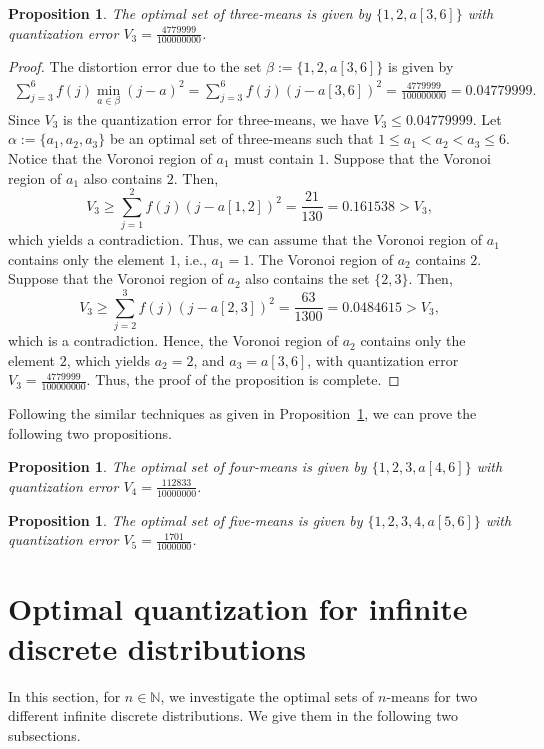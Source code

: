 \documentclass[12pt, reqno]{amsart}
\theoremstyle{plain}
\newtheorem{prop}[subsection]{Proposition}
\theoremstyle{definition}
\newcommand{\set}[1]{\{#1\}}%
\newcommand{\ga}{\alpha}
\newcommand{\gb}{\beta}
\newcommand{\D}[1]{\mathbb{#1}}%
\begin{document}
\begin{prop} \label{prop23}
The optimal set of three-means is given by $\set{1, 2, a[3,6]}$ with quantization error $V_3=\frac{4779999}{100000000}$.
\end{prop}
\begin{proof}
The distortion error due to the set $\gb:=\set{1, 2, a[3,6]}$ is given by
\begin{align*} \sum_{j=3}^6 f(j)\min_{a\in \gb} (j-a)^2=\sum _{j=3}^6 f(j)(j-a[3, 6])^2=\frac{4779999}{100000000}=0.04779999.
\end{align*}
Since $V_3$ is the quantization error for three-means, we have $V_3\leq 0.04779999$. Let $\ga:=\set{a_1, a_2, a_3}$ be an optimal set of three-means such that $1\leq a_1<a_2<a_3\leq 6$. Notice that the Voronoi region of $a_1$ must contain $1$. Suppose that the Voronoi region of $a_1$ also contains $2$. Then,
\[V_3\geq \sum_{j=1}^2 f(j)(j-a[1,2])^2 =\frac{21}{130}=0.161538>V_3,\]
which yields a contradiction. Thus, we can assume that the Voronoi region of $a_1$ contains only the element $1$, i.e., $a_1=1$. The Voronoi region of $a_2$ contains $2$. Suppose that the Voronoi region of $a_2$ also contains the set $\set{2,3}$. Then,
\[V_3\geq \sum_{j=2}^3 f(j)(j-a[2,3])^2=\frac{63}{1300}=0.0484615>V_3,\]
which is a contradiction. Hence, the Voronoi region of $a_2$ contains only the element $2$, which yields $a_2=2$, and $a_3=a[3,6]$, with quantization error $V_3=\frac{4779999}{100000000}$. Thus, the proof of the proposition is complete.
\end{proof}
Following the similar techniques as given in Proposition~\ref{prop23}, we can prove the following two propositions.
 \begin{prop} \label{prop24}
The optimal set of four-means is given by $\set{1, 2, 3, a[4,6]}$ with quantization error $V_4=\frac{112833}{10000000}$.
\end{prop}
 \begin{prop} \label{prop25}
The optimal set of five-means is given by $\set{1, 2, 3, 4, a[5,6]}$ with quantization error $V_5=\frac{1701}{1000000}$.
\end{prop}


\section{Optimal quantization for infinite discrete distributions} \label{sec2}

In this section, for $n\in\D N$, we investigate the optimal sets of $n$-means for two different infinite discrete distributions. We give them in the following two subsections.
\end{document}
